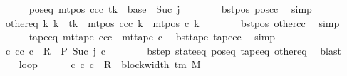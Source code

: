 \begin{isabellebody}
\ \ \ \ \isamarkupfalse%
\ pos{\isacharunderscore}{\kern0pt}eq{\isacharcolon}{\kern0pt}\ {\isachardoublequoteopen}mt{\isacharunderscore}{\kern0pt}pos\ ccc\ tk\ {\isacharequal}{\kern0pt}\ base\ {\isacharplus}{\kern0pt}\ Suc\ j{\isachardoublequoteclose}\isanewline
\ \ \ \ \ \ \isamarkupfalse%
\ bst{\isacharunderscore}{\kern0pt}pos\ pos{\isacharunderscore}{\kern0pt}cc\ \isamarkupfalse%
\ simp\isanewline
\ \ \ \ \isamarkupfalse%
\ other{\isacharunderscore}{\kern0pt}eq{\isacharcolon}{\kern0pt}\ {\isachardoublequoteopen}{\isasymforall}k{\isacharprime}{\kern0pt}{\isachardot}{\kern0pt}\ k{\isacharprime}{\kern0pt}\ {\isasymnoteq}\ tk\ {\isasymlongrightarrow}\ mt{\isacharunderscore}{\kern0pt}pos\ ccc\ k{\isacharprime}{\kern0pt}\ {\isacharequal}{\kern0pt}\ mt{\isacharunderscore}{\kern0pt}pos\ c{\isacharprime}{\kern0pt}\ k{\isacharprime}{\kern0pt}{\isachardoublequoteclose}\isanewline
\ \ \ \ \ \ \isamarkupfalse%
\ bst{\isacharunderscore}{\kern0pt}pos\ other{\isacharunderscore}{\kern0pt}cc\ \isamarkupfalse%
\ simp\isanewline
\ \ \ \ \isamarkupfalse%
\ tape{\isacharunderscore}{\kern0pt}eq{\isacharcolon}{\kern0pt}\ {\isachardoublequoteopen}mt{\isacharunderscore}{\kern0pt}tape\ ccc\ {\isacharequal}{\kern0pt}\ mt{\isacharunderscore}{\kern0pt}tape\ c{\isacharprime}{\kern0pt}{\isachardoublequoteclose}\ \isamarkupfalse%
\ bst{\isacharunderscore}{\kern0pt}tape\ tape{\isacharunderscore}{\kern0pt}cc\ \isamarkupfalse%
\ simp\isanewline
\ \ \ \ \isamarkupfalse%
\ {\isachardoublequoteopen}{\isasymexists}c{\isacharprime}{\kern0pt}{\isacharprime}{\kern0pt}{\isachardot}{\kern0pt}\ {\isacharparenleft}{\kern0pt}cc{\isacharcomma}{\kern0pt}\ c{\isacharprime}{\kern0pt}{\isacharprime}{\kern0pt}{\isacharparenright}{\kern0pt}\ {\isasymin}\ R{\isacharprime}{\kern0pt}\ {\isasymand}\ {\isacharquery}{\kern0pt}P\ {\isacharparenleft}{\kern0pt}Suc\ j{\isacharparenright}{\kern0pt}\ c{\isacharprime}{\kern0pt}{\isacharprime}{\kern0pt}{\isachardoublequoteclose}\isanewline
\ \ \ \ \ \ \isamarkupfalse%
\ bstep\ state{\isacharunderscore}{\kern0pt}eq\ pos{\isacharunderscore}{\kern0pt}eq\ tape{\isacharunderscore}{\kern0pt}eq\ other{\isacharunderscore}{\kern0pt}eq\ \isamarkupfalse%
\ blast\isanewline
\ \ \isamarkupfalse%
\isanewline
\ \ \isamarkupfalse%
\ loop{\isacharcolon}{\kern0pt}\isanewline
\ \ \ \ \ \ {\isachardoublequoteopen}{\isasymexists}c{\isacharprime}{\kern0pt}{\isacharprime}{\kern0pt}{\isachardot}{\kern0pt}\ {\isacharparenleft}{\kern0pt}c{\isacharprime}{\kern0pt}{\isacharcomma}{\kern0pt}\ c{\isacharprime}{\kern0pt}{\isacharprime}{\kern0pt}{\isacharparenright}{\kern0pt}\ {\isasymin}\ R{\isacharprime}{\kern0pt}\ {\isacharcircum}{\kern0pt}{\isacharcircum}{\kern0pt}\ {\isacharparenleft}{\kern0pt}block{\isacharunderscore}{\kern0pt}width\ {\isacharparenleft}{\kern0pt}{\isasymGamma}{\isacharunderscore}{\kern0pt}tm\ M{\isacharparenright}{\kern0pt}\ {\isacharminus}{\kern0pt}\ {}{\isacharparenright}{\kern0pt}\isanewline

\end{isabellebody}
